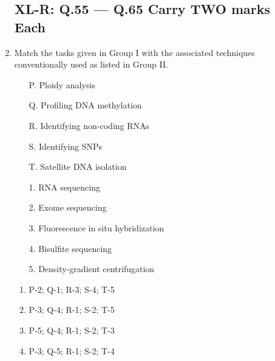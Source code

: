 \documentclass[journal,12pt,onecolumn]{IEEEtran}
\begin{document}
\begin{enumerate}
\subsection*{XL-R: Q.55 --- Q.65 Carry TWO marks Each}

    \item \begin{minipage}{0.45\textwidth}
    Match the tasks given in Group I with the associated techniques conventionally used as listed in Group II.
    \begin{itemize}
        \item[P.] Ploidy analysis
        \item[Q.] Profiling DNA methylation
        \item[R.] Identifying non-coding RNAs
        \item[S.] Identifying SNPs
        \item[T.] Satellite DNA isolation
    \end{itemize}
    \end{minipage}
    \begin{minipage}{0.45\textwidth}
    \begin{itemize}
        \item[1.] RNA sequencing
        \item[2.] Exome sequencing
        \item[3.] Fluorescence in situ hybridization
        \item[4.] Bisulfite sequencing
        \item[5.] Density-gradient centrifugation
    \end{itemize}
    \end{minipage}
    \begin{enumerate}
        \item P-2; Q-1; R-3; S-4; T-5
        \item P-3; Q-4; R-1; S-2; T-5
        \item P-5; Q-4; R-1; S-2; T-3
        \item P-3; Q-5; R-1; S-2; T-4
    \end{enumerate}


\end{enumerate}
\end{document}
